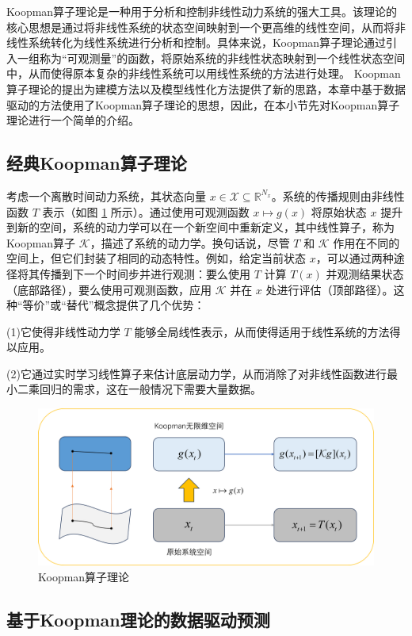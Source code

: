 \documentclass[lang=chs, degree=master, blindreview=false, winfonts=true]{yanputhesis}
\begin{document}
Koopman算子理论是一种用于分析和控制非线性动力系统的强大工具。该理论的核心思想是通过将非线性系统的状态空间映射到一个更高维的线性空间，从而将非线性系统转化为线性系统进行分析和控制。具体来说，Koopman算子理论通过引入一组称为“可观测量”的函数，将原始系统的非线性状态映射到一个线性状态空间中，从而使得原本复杂的非线性系统可以用线性系统的方法进行处理。
Koopman算子理论的提出为建模方法以及模型线性化方法提供了新的思路，本章中基于数据驱动的方法使用了Koopman算子理论的思想，因此，在本小节先对Koopman算子理论进行一个简单的介绍。

\subsection{经典Koopman算子理论}

考虑一个离散时间动力系统，其状态向量 \( x \in \mathcal{X} \subseteq \mathbb{R}^{N_x} \)。系统的传播规则由非线性函数 \( T \) 表示（如图 \ref{3_1} 所示）。通过使用可观测函数 \( x \mapsto g(x) \) 将原始状态 \( x \) 提升到新的空间，系统的动力学可以在一个新空间中重新定义，其中线性算子，称为Koopman算子 \( \mathcal{K} \)，描述了系统的动力学。换句话说，尽管 \( T \) 和 \( \mathcal{K} \) 作用在不同的空间上，但它们封装了相同的动态特性。例如，给定当前状态 \( x \)，可以通过两种途径将其传播到下一个时间步并进行观测：要么使用 \( T \) 计算 \( T(x) \) 并观测结果状态（底部路径），要么使用可观测函数，应用 \( \mathcal{K} \) 并在 \( x \) 处进行评估（顶部路径）。这种“等价”或“替代”概念提供了几个优势：

(1)它使得非线性动力学 \( T \) 能够全局线性表示，从而使得适用于线性系统的方法得以应用。

(2)它通过实时学习线性算子来估计底层动力学，从而消除了对非线性函数进行最小二乘回归的需求，这在一般情况下需要大量数据。
\begin{figure}[hbt!]
	\centering
	\includegraphics[width=34pc]{picture/3_1.png} 
	\caption{Koopman算子理论} \label{3_1}
\end{figure}
\subsection{基于Koopman理论的数据驱动预测}
\end{document}

